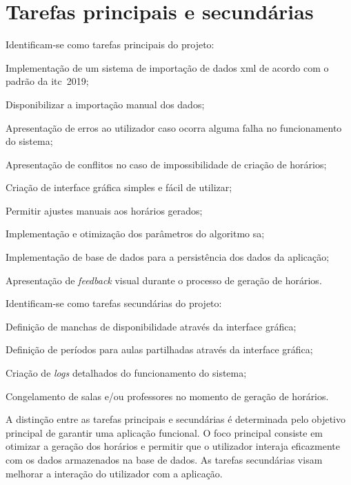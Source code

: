 \section{Tarefas principais e secundárias}
\label{capitulo3:Tarefas-principais-secundarias}

Identificam-se como tarefas principais do projeto:

\begin{compactitem}
    \item Implementação de um sistema de importação de dados \gls{xml} de acordo com o padrão da \gls{itc}~2019;
    \item Disponibilizar a importação manual dos dados;
    \item Apresentação de erros ao utilizador caso ocorra alguma falha no funcionamento do sistema;
    \item Apresentação de conflitos no caso de impossibilidade de criação de horários;
    \item Criação de interface gráfica simples e fácil de utilizar;
    \item Permitir ajustes manuais aos horários gerados;
    \item Implementação e otimização dos parâmetros do algoritmo \gls{sa};
    \item Implementação de base de dados para a persistência dos dados da aplicação;
    \item Apresentação de \textit{feedback} visual durante o processo de geração de horários.
\end{compactitem}

Identificam-se como tarefas secundárias do projeto:

\begin{compactitem}
    \item Definição de manchas de disponibilidade através da interface gráfica;
    \item Definição de períodos para aulas partilhadas através da interface gráfica;
    \item Criação de \textit{logs} detalhados do funcionamento do sistema;
    \item Congelamento de salas e/ou professores no momento de geração de horários.
\end{compactitem}

A distinção entre as tarefas principais e secundárias é determinada pelo objetivo principal de garantir uma aplicação funcional. O foco principal consiste em otimizar a geração dos horários e permitir que o utilizador interaja eficazmente com os dados armazenados na base de dados. As tarefas secundárias visam melhorar a interação do utilizador com a aplicação.

